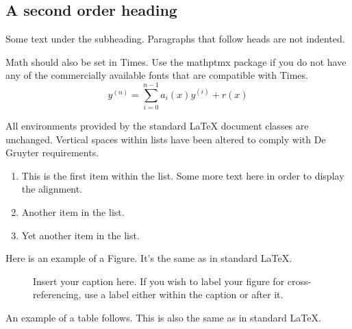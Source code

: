 \documentclass[letterpaper,12pt]{article}
\begin{document}
\subsection{A second order heading}

Some text under the subheading. Paragraphs that follow heads are not
indented.

Math should also be set in Times. Use the mathptmx package if you do not have
any of the commercially available fonts that are compatible with Times.
\begin{equation}
    y^{(n)} = \sum_{i=0}^{n-1} a_i(x) y^{(i)} + r(x) 
\end{equation}

All environments provided by the standard LaTeX document classes are
unchanged. Vertical spaces within lists have been altered to comply with De Gruyter
requirements.
\begin{enumerate}
\item This is the first item within the list. Some more text here in order to
  display the alignment.
\item Another item in the list.
\item Yet another item in the list.
\end{enumerate}

Here is an example of a Figure. It's the same as in standard LaTeX.

\begin{figure}[!h]
\centering
\caption{Insert your caption here. If you wish to label your figure for
  cross-referencing, use a label either within the caption or after it.}
\label{fig1}
\end{figure}

An example of a table follows. This is also the same as in standard LaTeX.
\end{document}
